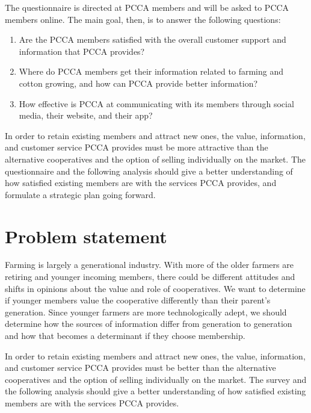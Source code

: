 \documentclass[a4paper]{article}
\begin{document}
The questionnaire is directed at PCCA members and will be asked to PCCA members online. The main goal, then, is to answer the following questions:

\begin{enumerate}[noitemsep]
	\item Are the PCCA members satisfied with the overall customer support and information that PCCA provides?
	\item Where do PCCA members get their information related to farming and cotton growing, and how can PCCA provide better information?
	\item How effective is PCCA at communicating with its members through social media, their website, and their app?
\end{enumerate}
 
In order to retain existing members and attract new ones, the value, information, and customer service PCCA provides must be more attractive than the alternative cooperatives and the option of selling individually on the market. The questionnaire and the following analysis should give a better understanding of how satisfied existing members are with the services PCCA provides, and formulate a strategic plan going forward. 

\newpage

\thispagestyle{empty}
\tableofcontents

\newpage
\pagestyle{fancy}
\setcounter{page}{1}

\doublespacing

\section{Problem statement}

Farming is largely a generational industry. With more of the older farmers are retiring and younger incoming members, there could be different attitudes and shifts in opinions about the value and role of cooperatives. We want to determine if younger members value the cooperative differently than their parent's generation. Since younger farmers are more technologically adept, we should determine how the sources of information differ from generation to generation and how that becomes a determinant if they choose membership. 

In order to retain existing members and attract new ones, the value, information, and customer service PCCA provides must be better than the alternative cooperatives and the option of selling individually on the market. The survey and the following analysis should give a better understanding of how satisfied existing members are with the services PCCA provides.
\end{document}
